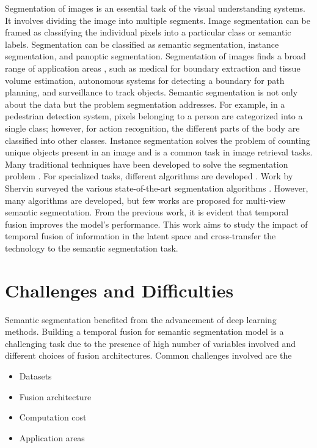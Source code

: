 	Segmentation of images is an essential task of the visual understanding systems. It involves dividing the image into multiple segments. Image segmentation can be framed as classifying the individual pixels into a particular class or semantic labels. Segmentation can be classified as semantic segmentation, instance segmentation, and panoptic segmentation. Segmentation of images finds a broad range of application areas \cite{21_forsyth2011computer}, such as medical for boundary extraction and tissue volume estimation, autonomous systems for detecting a boundary for path planning, and surveillance to track objects. Semantic segmentation is not only about the data but the problem segmentation addresses. For example, in a pedestrian detection system, pixels belonging to a person are categorized into a single class; however, for action recognition, the different parts of the body are classified into other classes. Instance segmentation \cite{22_dai2016instance} solves the problem of counting unique objects present in an image and is a common task in image retrieval tasks. Many traditional techniques have been developed to solve the segmentation problem \cite{23_fu1981survey}. For specialized tasks, different algorithms are developed \cite{24_ladys1994colour}. Work by Shervin surveyed the various state-of-the-art segmentation algorithms \cite{25_minaee2021image}. However, many algorithms are developed, but few works are proposed for multi-view semantic segmentation. From the previous work, it is evident that temporal fusion improves the model's performance. This work aims to study the impact of temporal fusion of information in the latent space and cross-transfer the technology to the semantic segmentation task. 

    \section{Challenges and Difficulties}
    
    Semantic segmentation benefited from the advancement of deep learning methods. Building a temporal fusion for semantic segmentation model is a challenging task due to the presence of high number of variables involved and different choices of fusion architectures. Common challenges involved are the 
   
    \begin{itemize}
    	\setlength\itemsep{0.01em}
    	\item Datasets
    	\item Fusion architecture
    	\item Computation cost
    	\item Application areas
    \end{itemize}
	
